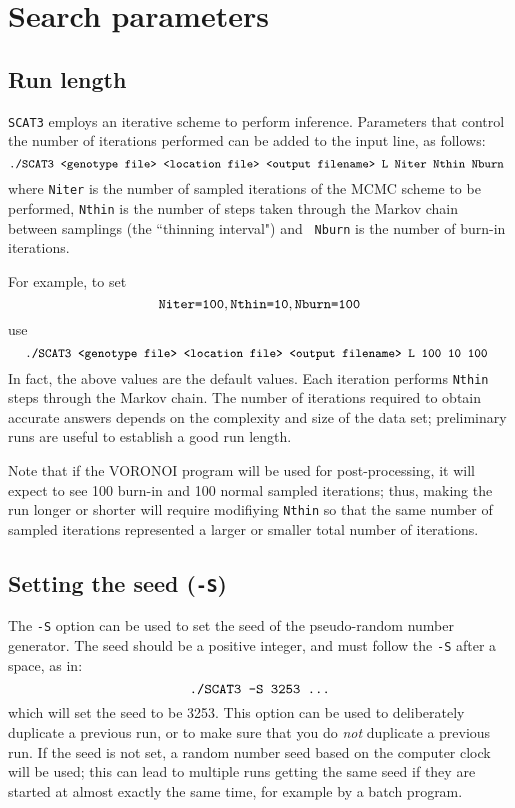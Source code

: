 \documentclass[10pt,titlepage,times,letterpaper]{article}
\def\SCAT{{\tt SCAT3} }
\begin{document}

\section{Search parameters} \label{HowLong}

\subsection{Run length}
\SCAT employs an iterative scheme to perform inference. 
Parameters that control the number of iterations performed
can be added to the input line, as follows:
$$\text{{\small \tt ./SCAT3 <genotype file> <location file> <output
filename> L Niter Nthin Nburn }}$$ where {\tt Niter} is the number
of sampled iterations of the MCMC scheme to be performed, {\tt Nthin} is the
number of steps taken through the Markov chain between samplings (the ``thinning interval") and {\tt
Nburn} is the number of burn-in iterations.

For example, to set
$$\text{{\tt Niter=100}}, \text{{\tt Nthin=10}}, \text{{\tt Nburn=100}}$$
use
$$\text{{\tt \small./SCAT3 <genotype file> <location file> <output
filename> L 100 10 100 }}$$ 
In fact, the above values are the
default values. Each iteration performs {\tt Nthin}
steps through the Markov chain.
The number of iterations required to obtain accurate answers depends
on the complexity and size of the data set; preliminary runs are useful
to establish a good run length.

Note that if the VORONOI program will be used for post-processing, it will
expect to see 100 burn-in and 100 normal sampled iterations; thus, making the
run longer or shorter will require modifiying {\tt Nthin} so that the same
number of sampled iterations represented a larger or smaller total number
of iterations.

\subsection{Setting the seed ({\tt -S})} \label{Soption}

The {\tt -S} option can be used to set the seed of the
pseudo-random number generator. The seed should be a
positive integer, and must follow the {\tt -S} after a space, as in:
$$\text{{\tt ./SCAT3 -S 3253 ...}}$$
which will set the seed to be 3253. This option can be
used to deliberately duplicate a previous run, or to make sure 
that you do {\it not}
duplicate a previous run.  If the seed is not set, a 
random number seed based on the computer clock will be used;
this can lead to multiple runs getting the same seed if they are started
at almost exactly the same time, for example by a batch program.
\end{document}
